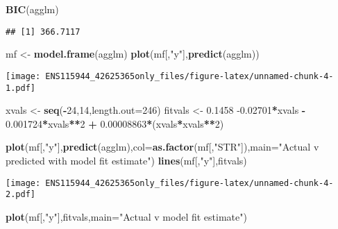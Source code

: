 \documentclass[
]{article}
\newenvironment{Shaded}{\begin{snugshade}}{\end{snugshade}}
\newcommand{\DataTypeTok}[1]{\textcolor[rgb]{0.13,0.29,0.53}{#1}}
\newcommand{\DecValTok}[1]{\textcolor[rgb]{0.00,0.00,0.81}{#1}}
\newcommand{\FloatTok}[1]{\textcolor[rgb]{0.00,0.00,0.81}{#1}}
\newcommand{\KeywordTok}[1]{\textcolor[rgb]{0.13,0.29,0.53}{\textbf{#1}}}
\newcommand{\NormalTok}[1]{#1}
\newcommand{\OperatorTok}[1]{\textcolor[rgb]{0.81,0.36,0.00}{\textbf{#1}}}
\newcommand{\StringTok}[1]{\textcolor[rgb]{0.31,0.60,0.02}{#1}}
\begin{document}
\begin{Shaded}
\begin{Highlighting}[]
\KeywordTok{BIC}\NormalTok{(agglm)}
\end{Highlighting}
\end{Shaded}

\begin{verbatim}
## [1] 366.7117
\end{verbatim}

\begin{Shaded}
\begin{Highlighting}[]
\NormalTok{mf <-}\StringTok{ }\KeywordTok{model.frame}\NormalTok{(agglm)}
\KeywordTok{plot}\NormalTok{(mf[,}\StringTok{"y"}\NormalTok{],}\KeywordTok{predict}\NormalTok{(agglm))}
\end{Highlighting}
\end{Shaded}

\texttt{[image: ENS115944\_42625365only\_files/figure-latex/unnamed-chunk-4-1.pdf]}

\begin{Shaded}
\begin{Highlighting}[]
\NormalTok{xvals <-}\StringTok{ }\KeywordTok{seq}\NormalTok{(}\OperatorTok{-}\DecValTok{24}\NormalTok{,}\DecValTok{14}\NormalTok{,}\DataTypeTok{length.out=}\DecValTok{246}\NormalTok{)}
\NormalTok{fitvals <-}\StringTok{ }\FloatTok{0.1458} \FloatTok{-0.02701}\OperatorTok{*}\NormalTok{xvals }\OperatorTok{-}\StringTok{ }\FloatTok{0.001724}\OperatorTok{*}\NormalTok{xvals}\OperatorTok{**}\DecValTok{2} \OperatorTok{+}\StringTok{ }\FloatTok{0.00008863}\OperatorTok{*}\NormalTok{(xvals}\OperatorTok{*}\NormalTok{xvals}\OperatorTok{**}\DecValTok{2}\NormalTok{)}


\KeywordTok{plot}\NormalTok{(mf[,}\StringTok{"y"}\NormalTok{],}\KeywordTok{predict}\NormalTok{(agglm),}\DataTypeTok{col=}\KeywordTok{as.factor}\NormalTok{(mf[,}\StringTok{"STR"}\NormalTok{]),}\DataTypeTok{main=}\StringTok{"Actual v predicted with model fit estimate"}\NormalTok{)}
\KeywordTok{lines}\NormalTok{(mf[,}\StringTok{"y"}\NormalTok{],fitvals)}
\end{Highlighting}
\end{Shaded}

\texttt{[image: ENS115944\_42625365only\_files/figure-latex/unnamed-chunk-4-2.pdf]}

\begin{Shaded}
\begin{Highlighting}[]
\KeywordTok{plot}\NormalTok{(mf[,}\StringTok{"y"}\NormalTok{],fitvals,}\DataTypeTok{main=}\StringTok{"Actual v model fit estimate"}\NormalTok{)}
\end{Highlighting}
\end{Shaded}
\end{document}
